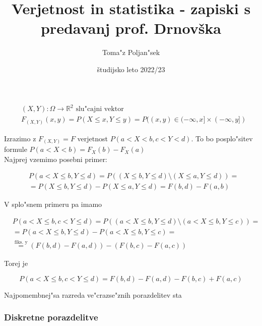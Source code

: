 \documentclass[a4paper,12pt]{article}
\theoremstyle{definition}
\theoremstyle{remark}
\newcommand{\R}{\mathbb{R}}
\begin{document}
\title{Verjetnost in statistika - zapiski s predavanj prof. Drnovška}
\author{
	Toma"z Poljan"sek
}
\date{študijsko leto 2022/23}
\maketitle


\tableofcontents
\newpage
{}





\begin{align*}
    &(X,Y): \Omega \to \R^2 \text{ slu"cajni vektor} \\
    &F_{(X,Y)}(x,y) = P(X \leq x, Y \leq y) = P((x,y) \in (-\infty, x] \times (-\infty, y])
\end{align*}

Izrazimo z $F_{(X,Y)} = F$ verjetnost $P(a < X < b, c < Y < d)$. To bo posplo"sitev formule
$P(a < X < b) = F_X(b) - F_X(a)$ \\
Najprej vzemimo posebni primer:

\begin{align*}
    &P(a < X \leq b, Y \leq d) = P((X \leq b, Y \leq d) \text{\textbackslash} (X \leq a, Y \leq d)) = \\
    &=P (X \leq b, Y \leq d) - P(X \leq a, Y \leq d) = F(b,d) - F(a,b)
\end{align*}

V splo"snem primeru pa imamo

\begin{align*}
    &P(a < X \leq b, c < Y \leq d) = P((a < X \leq b, Y \leq d) \text{\textbackslash}
        (a < X \leq b, Y \leq c)) = \\
    &= P(a < X \leq b, Y \leq d) - P(a < X \leq b, Y \leq c) = \\
    &\stackrel{\text{fiks. y}}{=} (F(b,d) - F(a,d)) - (F(b,c) - F(a,c))
\end{align*}

Torej je

\begin{equation*}
    P(a < X \leq b, c < Y \leq d) = F(b,d) - F(a,d) - F(b,c) + F(a,c)
\end{equation*}

Najpomembnej"sa razreda ve"crazse"znih porazdelitev sta

\subsubsection{Diskretne porazdelitve}
\end{document}
